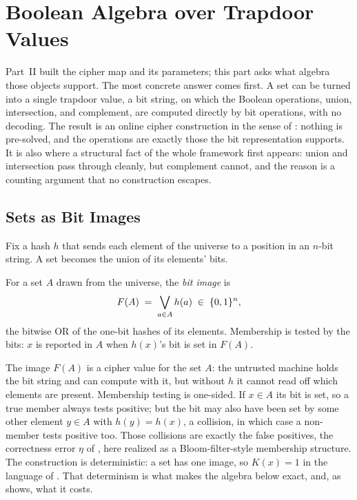 
\chapter{Boolean Algebra over Trapdoor Values}
\label{ch:boolean-algebra}

Part~II built the cipher map and its parameters; this part asks what
algebra those objects support. The most concrete answer comes first. A set
can be turned into a single trapdoor value, a bit string, on which the
Boolean operations, union, intersection, and complement, are computed
directly by bit operations, with no decoding. The result is an online
cipher construction in the sense of : nothing is
pre-solved, and the operations are exactly those the bit representation
supports. It is also where a structural fact of the whole framework first
appears: union and intersection pass through cleanly, but complement cannot,
and the reason is a counting argument that no construction escapes.

\section{Sets as Bit Images}
\label{sec:bit-images}

Fix a hash $h$ that sends each element of the universe to a position in an
$n$-bit string. A set becomes the union of its elements' bits.

\begin{definition}
\label{def:bit-image}
For a set $A$ drawn from the universe, the \emph{bit image} is
\[
  F(A) \;=\; \bigvee_{a \in A} h(a) \;\in\; \{0,1\}^n,
\]
the bitwise OR of the one-bit hashes of its elements. Membership is tested
by the bits: $x$ is reported in $A$ when $h(x)$'s bit is set in $F(A)$.
\end{definition}

The image $F(A)$ is a cipher value for the set $A$: the untrusted machine
holds the bit string and can compute with it, but without $h$ it cannot
read off which elements are present. Membership testing is one-sided. If
$x \in A$ its bit is set, so a true member always tests positive; but the
bit may also have been set by some other element $y \in A$ with
$h(y) = h(x)$, a collision, in which case a non-member tests positive too.
Those collisions are exactly the false positives, the correctness error
$\eta$ of , here realized as a Bloom-filter-style
membership structure. The construction is deterministic: a set has one
image, so $K(x) = 1$ in the language of . That
determinism is what makes the algebra below exact, and, as
 shows, what it costs.

